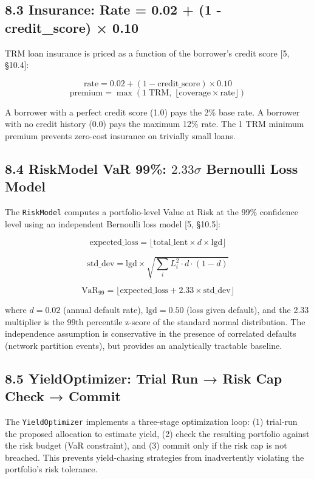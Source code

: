 \documentclass[
  11pt,
]{article}
\begin{document}
\subsection{8.3 Insurance: Rate = 0.02 + (1 - credit\_score) ×
0.10}\label{insurance-rate-0.02-1---credit_score-0.10}

TRM loan insurance is priced as a function of the borrower's credit
score {[}5, §10.4{]}:

\[\text{rate} = 0.02 + (1 - \text{credit\_score}) \times 0.10\]
\[\text{premium} = \max(1\;\text{TRM},\; \lfloor\text{coverage} \times \text{rate}\rfloor)\]

A borrower with a perfect credit score (1.0) pays the 2\% base rate. A
borrower with no credit history (0.0) pays the maximum 12\% rate. The 1
TRM minimum premium prevents zero-cost insurance on trivially small
loans.

\subsection{\texorpdfstring{8.4 RiskModel VaR 99\%: \(2.33\sigma\)
Bernoulli Loss
Model}{8.4 RiskModel VaR 99\%: 2.33\textbackslash sigma Bernoulli Loss Model}}\label{riskmodel-var-99-2.33sigma-bernoulli-loss-model}

The \texttt{RiskModel} computes a portfolio-level Value at Risk at the
99\% confidence level using an independent Bernoulli loss model {[}5,
§10.5{]}:

\[\text{expected\_loss} = \lfloor\text{total\_lent} \times d \times \text{lgd}\rfloor\]

\[\text{std\_dev} = \text{lgd} \times \sqrt{\sum_i L_i^2 \cdot d \cdot (1-d)}\]

\[\text{VaR}_{99} = \lfloor\text{expected\_loss} + 2.33 \times \text{std\_dev}\rfloor\]

where \(d = 0.02\) (annual default rate), \(\text{lgd} = 0.50\) (loss
given default), and the 2.33 multiplier is the 99th percentile z-score
of the standard normal distribution. The independence assumption is
conservative in the presence of correlated defaults (network partition
events), but provides an analytically tractable baseline.

\subsection{8.5 YieldOptimizer: Trial Run → Risk Cap Check →
Commit}\label{yieldoptimizer-trial-run-risk-cap-check-commit}

The \texttt{YieldOptimizer} implements a three-stage optimization loop:
(1) trial-run the proposed allocation to estimate yield, (2) check the
resulting portfolio against the risk budget (VaR constraint), and (3)
commit only if the risk cap is not breached. This prevents yield-chasing
strategies from inadvertently violating the portfolio's risk tolerance.
\end{document}
